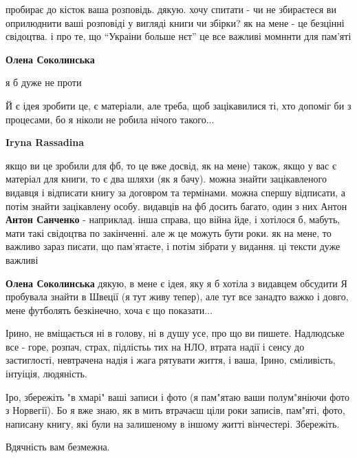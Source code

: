 пробирає до кісток ваша розповідь. дякую. хочу спитати - чи не збираєтеся ви
оприлюднити ваші розповіді у вигляді книги чи збірки? як на мене - це безцінні
свідоцтва. і про те, що \enquote{Украіни больше нєт} це все важливі момннти для пам'яті

\begin{itemize} %
\textbf{Олена Соколинська} 

я б дуже не проти

Й є ідея зробити це, є матеріали, але треба, щоб зацікавилися ті, хто допоміг
би з процесами, бо я ніколи не робила нічого такого...

\textbf{Iryna Rassadina} 

якщо ви це зробили для фб, то це вже досвід, як на мене) також, якщо у вас є
матеріал для книги, то є два шляхи (як я бачу). можна знайти зацікавленого
видавця і відписати книгу за договром та термінами. можна спершу відписати, а
потім знайти зацікавлену особу. видавців на фб досить багато, один з них Антон
\textbf{Антон Санченко} - наприклад. інша справа, що війна йде, і хотілося б, мабуть,
мати такі свідоцтва по закінченні. але ж це можуть бути роки. як на мене, то
важливо зараз писати, що пам'ятаєте, і потім зібрати у видання. ці тексти дуже
важливі

\textbf{Олена Соколинська} дякую, в мене є ідея, яку я б хотіла з видавцем обсудити
Я пробувала знайти в Швеції (я тут живу тепер), але тут все занадто важко і довго, мене футболять безкінечно, хоча є що показати...
\end{itemize} %


Ірино, не вміщається ні в голову, ні в душу усе, про що ви пишете. Надлюдське
все - горе, розпач, страх, підлістьь тих на НЛО, втрата надії і сенсу до
застиглості, невтрачена надія і жага рятувати життя, і ваша, Ірино, сміливість,
інтуіція, людяність.

Іро, збережіть "в хмарі" ваші записи і фото (я пам"ятаю ваши полум"яніючи фото
з Норвегії). Бо я вже знаю, як в мить втрачаєш ціли роки записів, пам"яті,
фото, написану книгу, які були на залишеному в іншому житті вінчестері.
Збережіть.

Вдячність вам безмежна.

